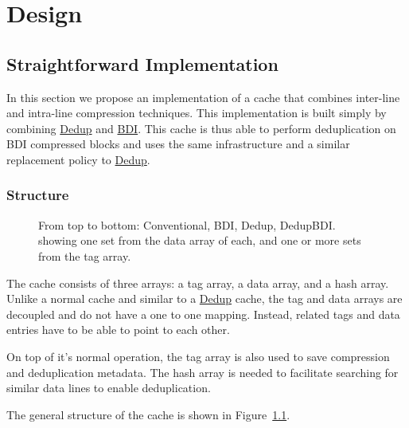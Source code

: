
\chapter{Design}
\label{ch:Design}

\section{Straightforward Implementation}
\label{sec:Straightforward Implementation}
In this section we propose an implementation of a cache that combines inter-line and intra-line compression techniques. This implementation is built simply by combining \hyperref[sec:Dedup]{Dedup} and \hyperref[sec:BDI]{BDI}. This cache is thus able to perform deduplication on BDI compressed blocks and uses the same infrastructure and a similar replacement policy to \hyperref[sec:Dedup]{Dedup}.

\subsection{Structure}
\label{ssec:DedupBDIStructure}
\begin{figure}
    \caption[DedupBDI Cache]{From top to bottom: Conventional, BDI, Dedup, DedupBDI. showing one set from the data array of each, and one or more sets from the tag array.}
    \label{fig:DedupBDI}
\end{figure}
The cache consists of three arrays: a tag array, a data array, and a hash array. Unlike a normal cache and similar to a \hyperref[sec:Dedup]{Dedup} cache, the tag and data arrays are decoupled and do not have a one to one mapping. Instead, related tags and data entries have to be able to point to each other.\par
On top of it's normal operation, the tag array is also used to save compression and deduplication metadata. The hash array is needed to facilitate searching for similar data lines to enable deduplication.\par
The general structure of the cache is shown in Figure~\ref{fig:DedupBDI}.

